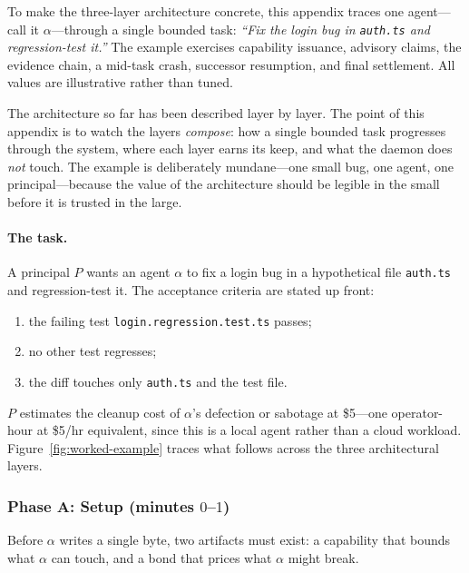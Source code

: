 \documentclass[11pt,a4paper]{article}
\theoremstyle{definition}
\theoremstyle{remark}
\begin{document}
To make the three-layer architecture concrete, this appendix traces one agent---call it $\alpha$---through a single bounded task: \emph{``Fix the login bug in \texttt{auth.ts} and regression-test it.''} The example exercises capability issuance, advisory claims, the evidence chain, a mid-task crash, successor resumption, and final settlement. All values are illustrative rather than tuned.

The architecture so far has been described layer by layer. The point of this appendix is to watch the layers \emph{compose}: how a single bounded task progresses through the system, where each layer earns its keep, and what the daemon does \emph{not} touch. The example is deliberately mundane---one small bug, one agent, one principal---because the value of the architecture should be legible in the small before it is trusted in the large.

\paragraph{The task.} A principal $P$ wants an agent $\alpha$ to fix a login bug in a hypothetical file \texttt{auth.ts} and regression-test it. The acceptance criteria are stated up front:
\begin{enumerate}[nosep,leftmargin=*,topsep=2pt]
  \item the failing test \texttt{login.regression.test.ts} passes;
  \item no other test regresses;
  \item the diff touches only \texttt{auth.ts} and the test file.
\end{enumerate}
$P$ estimates the cleanup cost of $\alpha$'s defection or sabotage at \$5---one operator-hour at \$5/hr equivalent, since this is a local agent rather than a cloud workload. Figure~\ref{fig:worked-example} traces what follows across the three architectural layers.



\subsubsection*{Phase A: Setup (minutes $0$--$1$)}

Before $\alpha$ writes a single byte, two artifacts must exist: a capability that bounds what $\alpha$ can touch, and a bond that prices what $\alpha$ might break.
\end{document}
